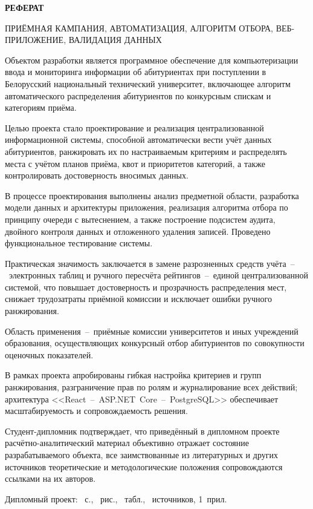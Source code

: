 \clearpage
\setcounter{page}{3}
\thispagestyle{empty}

{\centering\textbf{РЕФЕРАТ}\par}
\vspace{12pt}

ПРИЁМНАЯ КАМПАНИЯ, АВТОМАТИЗАЦИЯ, АЛГОРИТМ ОТБОРА, ВЕБ-ПРИЛОЖЕНИЕ, ВАЛИДАЦИЯ ДАННЫХ

Объектом разработки является программное обеспечение для компьютеризации ввода и мониторинга информации об абитуриентах при поступлении в Белорусский национальный технический университет, включающее алгоритм автоматического распределения абитуриентов по конкурсным спискам и категориям приёма.

Целью проекта стало проектирование и реализация централизованной информационной системы, способной автоматически вести учёт данных абитуриентов, ранжировать их по настраиваемым критериям и распределять места с учётом планов приёма, квот и приоритетов категорий, а также контролировать достоверность вносимых данных.

В процессе проектирования выполнены анализ предметной области, разработка модели данных и архитектуры приложения, реализация алгоритма отбора по принципу очереди с вытеснением, а также построение подсистем аудита, двойного контроля данных и отложенного удаления записей.
Проведено функциональное тестирование системы.

Практическая значимость заключается в замене разрозненных средств учёта~--~электронных таблиц и ручного пересчёта рейтингов~--~единой централизованной системой, что повышает достоверность и прозрачность распределения мест, снижает трудозатраты приёмной комиссии и исключает ошибки ручного ранжирования.

Область применения~--~приёмные комиссии университетов и иных учреждений образования, осуществляющих конкурсный отбор абитуриентов по совокупности оценочных показателей.

В рамках проекта апробированы гибкая настройка критериев и групп ранжирования, разграничение прав по ролям и журналирование всех действий; архитектура <<React~--~ASP.NET~Core~--~PostgreSQL>> обеспечивает масштабируемость и сопровождаемость решения.

Студент-дипломник подтверждает, что приведённый в дипломном проекте расчётно-аналитический материал объективно отражает состояние разрабатываемого объекта, все заимствованные из литературных и других источников теоретические и методологические положения сопровождаются ссылками на их авторов.

Дипломный проект: \pageref{lastmainpage}~с., \totfig~рис., \tottab~табл., \totref~источников, 1~прил.
\clearpage
